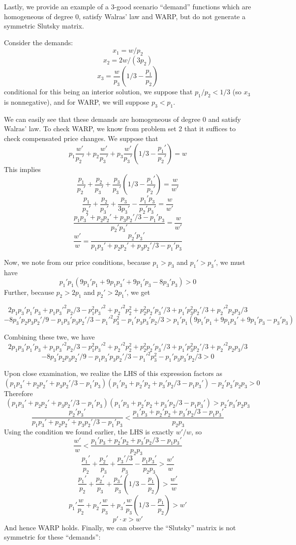 \documentclass[10pt,letter]{article}
\begin{document}
Lastly, we provide an example of a 3-good scenario ``demand'' functions which are homogeneous of degree 0, satisfy Walras' law and WARP, but do not generate a symmetric Slutsky matrix.

Consider the demands:
\[ x_1 = w/p_2 \]
\[ x_2 = 2w/(3p_2) \]
\[ x_3 = \frac{w}{p_3}\left(1/3 - \frac{p_1}{p_2}\right) \]
conditional for this being an interior solution, we suppose that $p_1/p_2 < 1/3$ (so $x_3$ is nonnegative), and for WARP, we will suppose $p_3 < p_1$.

We can easily see that these demands are homogeneous of degree 0 and satisfy Walras' law. To check WARP, we know from problem set 2 that it suffices to check compensated price changes. We suppose that
\[ p_1 \frac{w'}{p_2'} + p_2 \frac{w'}{p_3'} + p_3 \frac{w'}{p_3'}\left(1/3 - \frac{p_1'}{p_2'}\right) = w \]
This implies
\[ \frac{p_1}{p_2'} + \frac{p_2}{p_3'} + \frac{p_3}{p_3'} \left(1/3 - \frac{p_1'}{p_2'}\right) = \frac{w}{w'}\]
\[ \frac{p_1}{p_2'} + \frac{p_2}{p_3'} + \frac{p_3}{3p_3'} - \frac{p_1'p_3}{p_2'p_3'}  = \frac{w}{w'}\]
\[ \frac{p_1p_3' + p_2p_2'+ p_3p_2'/3 - p_1'p_3}{p_2'p_3'}= \frac{w}{w'}\]
\[ \frac{w'}{w} = \frac{p_2'p_3'}{p_1p_3' + p_2p_2'+ p_3p_2'/3 - p_1'p_3}\]

Now, we note from our price conditions, because $p_1 > p_3$ and $p_1' > p_3'$, we must have
\[ p_1'p_1 (9p_1'p_1+9p_1p_3' +9p_1'p_3- 8p_3'p_3) > 0 \]
Further, because $p_2 > 2p_1$ and $p_2' > 2p_1'$, we get

\[ 2p_1p_3'p_1'p_3+p_1p_3'^2p_2/3-p_1^2p_3'^2  +p_2'^2p_2^2+p_2^2p_2'p_3'/3 + p_1'p_3^2p_2'/3+p_2'^2p_2p_3/3\]
\[ - 8p_3'p_2p_3p_2'/9-p_1p_3'p_3p_2'/3 - p_1'^2p_3^2 - p_1'p_3p_3'p_2/3 > p_1'p_1 (9p_1'p_1+9p_1p_3' +9p_1'p_3- p_3'p_3)\]

Combining these twe, we have
\[ 2p_1p_3'p_1'p_3+p_1p_3'^2p_2/3-p_1^2p_3'^2  +p_2'^2p_2^2+p_2^2p_2'p_3'/3 + p_1'p_3^2p_2'/3+p_2'^2p_2p_3/3\]
\[ - 8p_3'p_2p_3p_2'/9-p_1p_3'p_3p_2'/3 - p_1'^2p_3^2 - p_1'p_3p_3'p_2/3 > 0 \]

Upon close examination, we realize the LHS of this expression factors as
\[  (p_1p_3' + p_2p_2'+ p_3p_2'/3 - p_1'p_3) (p_1'p_3+p_2'p_2+p_3'p_2/3-p_1p_3') - p_2'p_3'p_2p_3 > 0  \]
Therefore
\[  (p_1p_3' + p_2p_2'+ p_3p_2'/3 - p_1'p_3) (p_1'p_3+p_2'p_2+p_3'p_2/3-p_1p_3') > p_2'p_3'p_2p_3   \]
\[\frac{p_2'p_3'}{p_1p_3' + p_2p_2'+ p_3p_2'/3 - p_1'p_3} < \frac{p_1'p_3+p_2'p_2+p_3'p_2/3 -p_1p_3'}{p_2p_3}  \]
Using the condition we found earlier, the LHS is exactly $w'/w$, so
\[\frac{w'}{w} < \frac{p_1'p_3+p_2'p_2+p_3'p_2/3-p_1p_3'}{p_2p_3}  \]
\[ \frac{p_1'}{p_2} + \frac{p_2'}{p_3} +  \frac{p_3'/3}{p_3} - \frac{p_1p_3'}{p_2p_3}  > \frac{w'}{w} \]
\[ \frac{p_1'}{p_2} + \frac{p_2'}{p_3} +  \frac{p_3'}{p_3}\left(1/3 - \frac{p_1}{p_2}\right) > \frac{w'}{w} \]
\[ p_1'\frac{w}{p_2} + p_2'\frac{w}{p_3} + p_3' \frac{w}{p_3}\left(1/3 - \frac{p_1}{p_2} \right) > w' \]
\[ p' \cdot x > w' \]
And hence WARP holds. Finally, we can observe the ``Slutsky'' matrix is not symmetric for these ``demands'':
\end{document}
